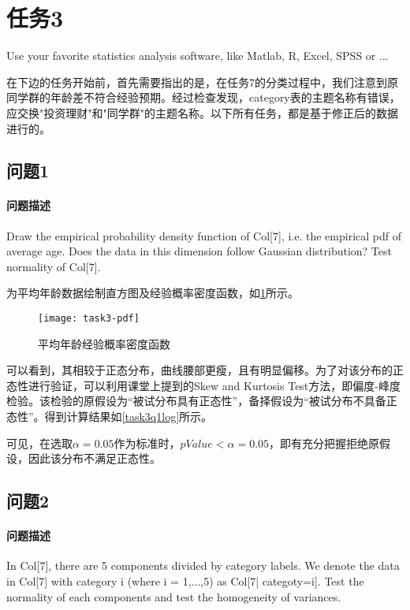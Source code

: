 \documentclass[a4paper,12pt]{article}
\begin{document}
    \section{任务3} %
    Use your favorite statistics analysis software, like Matlab, R, Excel, SPSS or ...

    在下边的任务开始前，首先需要指出的是，在任务7的分类过程中，我们注意到原同学群的年龄差不符合经验预期。经过检查发现，category表的主题名称有错误，应交换"投资理财"和"同学群"的主题名称。以下所有任务，都是基于修正后的数据进行的。

    \subsection{问题1} %
    \paragraph{问题描述} Draw the empirical probability density function of Col[7], i.e. the empirical pdf of average age. Does the data in this dimension follow Gaussian distribution? Test normality of Col[7].

    为平均年龄数据绘制直方图及经验概率密度函数，如\cref{fig:task3-pdf}所示。
    \begin{figure}[htbp]
        \centering
        \texttt{[image: task3-pdf]}
        \caption{平均年龄经验概率密度函数}
        \label{fig:task3-pdf}
    \end{figure}

    可以看到，其相较于正态分布，曲线腰部更瘦，且有明显偏移。为了对该分布的正态性进行验证，可以利用课堂上提到的Skew and Kurtosis Test方法\cite{hypotest}，即偏度-峰度检验。该检验的原假设为“被试分布具有正态性”，备择假设为“被试分布不具备正态性”\cite{zhengtai}。得到计算结果如\cref{task3q1log}所示。
    

    可见，在选取$\alpha=0.05$作为标准时，$pValue<\alpha=0.05$，即有充分把握拒绝原假设，因此该分布不满足正态性。

    \subsection{问题2} %
    \paragraph{问题描述} In Col[7], there are 5 components divided by category labels. We denote the data in Col[7] with category i (where i = 1,...,5) as Col[7| categoty=i]. Test the normality of each components and test the homogeneity of variances.
\end{document}
